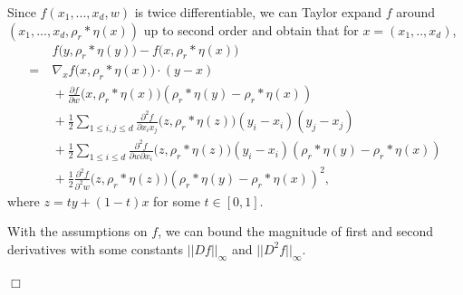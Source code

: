 \documentclass[12pt]{article}
\newenvironment {proof}{{\noindent\bf Proof }}{\hfill $\Box$ \medskip}
\begin{document}
\begin{proof}
Since $f(x_1,...,x_d,w)$ is twice differentiable, we can Taylor expand $f$ around  $(x_1,...,x_d,\rho_{r}*\eta(x))$ up to second order and obtain that for $x=(x_1,..,x_d)$,
\begin{equation}
\begin{aligned}
&~f\big(y,\rho_{r}*\eta(y)\big)-f\big(x,\rho_{r}*\eta(x)\big)\\
=&~ \nabla_x f \big(x,\rho_{r}*\eta(x)\big)
            \cdot (y-x)\\ 
        &~ + \frac{\partial f}{\partial w}
            \big(x,\rho_{r}*\eta(x)\big) \left(\rho_{r}*\eta(y)-\rho_{r}*\eta(x)\right)\\
        &~ + \frac{1}{2}\sum_{1 \leq i,j \leq d }\frac{\partial^2 f}{\partial x_i x_j}
            \big(z,\rho_{r}*\eta(z)\big) (y_i-x_i)(y_j-x_j)\\
        &~ + \frac{1}{2}\sum_{1 \leq i \leq d}
                \frac{\partial^2 f}{\partial w \partial x_i}
                 \big(z,\rho_{r}*\eta(z)\big) (y_i-x_i)
                    \left(\rho_{r}*\eta(y)-\rho_{r}*\eta(x)\right)\\
        &~ + \frac{1}{2}\frac{\partial^2 f}{\partial^2 w}
            \big(z,\rho_{r}*\eta(z)\big)
            \left(
            \rho_{r}*\eta(y)-\rho_{r}*\eta(x)
            \right)^2,
\end{aligned}    
\end{equation}
where $z=ty+(1-t)x$ for some $t \in [0,1]$.

With the assumptions on $f$, we can bound the magnitude
of first and second derivatives with 
some constants $||Df||_{\infty}$ and $||D^2f||_{\infty}$.


\end{proof}
\end{document}
